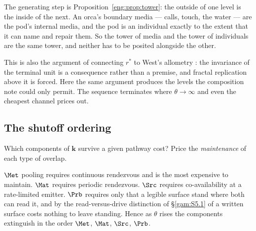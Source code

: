 The generating step is Proposition~\ref{eng:prop:tower}: the outside of one
level is the inside of the next. An orca's boundary media --- calls, touch,
the water --- are the pod's internal media, and the pod is an individual
exactly to the extent that it can name and repair them. So the tower of
media and the tower of individuals are the same tower, and neither has to
be posited alongside the other.

This is also the argument of \cite[\S6]{compaut} connecting $r^\ast$ to
West's allometry \cite{west}: the invariance of the terminal unit is a consequence
rather than a premise, and fractal replication above it is forced. Here the
same argument produces the levels the composition note could only permit.
The sequence terminates where $\theta \to \infty$ and even the cheapest
channel prices out.

\subsection{The shutoff ordering}\label{eng:S9.2}

Which components of $\mathbf{k}$ survive a given pathway cost? Price the
\emph{maintenance} of each type of overlap.

\begin{observation}\label{eng:obs:order}
$\Met$ pooling requires continuous rendezvous and is the most expensive to
maintain. $\Mat$ requires periodic rendezvous. $\Src$ requires
co-availability at a rate-limited emitter. $\Prb$ requires only that a
legible surface stand where both can read it, and by the read-versus-drive
distinction of \S\ref{gam:S5.1} of \chGame a written surface costs nothing to leave
standing. Hence as $\theta$ rises the components extinguish in the order
$\Met$, $\Mat$, $\Src$, $\Prb$.
\end{observation}

